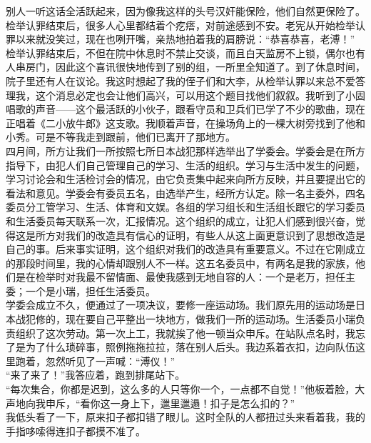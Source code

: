 别人一听这话全活跃起来，因为像我这样的头号汉奸能保险，他们自然更保险了。\\

检举认罪结束后，很多人心里都结着个疙瘩，对前途感到不安。老宪从开始检举认罪以来就没笑过，现在也咧开嘴，亲热地拍着我的肩膀说：“恭喜恭喜，老溥！”\\

检举认罪结束后，不但在院中休息时不禁止交谈，而且白天监房不上锁，偶尔也有人串房门，因此这个喜讯很快地传到了别的组，一所里全知道了。到了休息时间，院子里还有人在议论。我这时想起了我的侄子们和大李，从检举认罪以来总不爱答理我，这个消息必定也会让他们高兴，可以用这个题目找他们叙叙。我听到了小固唱歌的声音——这个最活跃的小伙子，跟看守员和卫兵们已学了不少的歌曲，现在正唱着《二小放牛郎》这支歌。我顺着声音，在操场角上的一棵大树旁找到了他和小秀。可是不等我走到跟前，他们已离开了那地方。\\

四月间，所方让我们一所按照七所日本战犯那样选举出了学委会。学委会是在所方指导下，由犯人们自己管理自己的学习、生活的组织。学习与生活中发生的问题，学习讨论会和生活检讨会的情况，由它负责集中起来向所方反映，并且要提出它的看法和意见。学委会有委员五名，由选举产生，经所方认定。除一名主委外，四名委员分工管学习、生活、体育和文娱。各组的学习组长和生活组长跟它的学习委员和生活委员每天联系一次，汇报情况。这个组织的成立，让犯人们感到很兴奋，觉得这是所方对我们的改造具有信心的证明，有些人从这上面更意识到了思想改造是自己的事。后来事实证明，这个组织对我们的改造具有重要意义。不过在它刚成立的那段时间里，我的心情却跟别人不一样。这五名委员中，有两名是我的家族，他们是在检举时对我最不留情面、最使我感到无地自容的人：一个是老万，担任主委；一个是小瑞，担任生活委员。\\

学委会成立不久，便通过了一项决议，要修一座运动场。我们原先用的运动场是日本战犯修的，现在要自己平整出一块地方，做我们一所的运动场。生活委员小瑞负责组织了这次劳动。第一次上工，我就挨了他一顿当众申斥。在站队点名时，我忘了是为了什么琐碎事，照例拖拖拉拉，落在别人后头。我边系着衣扣，边向队伍这里跑着，忽然听见了一声喊：“溥仪！”\\

“来了来了！”我答应着，跑到排尾站下。\\

“每次集合，你都是迟到，这么多的人只等你一个，一点都不自觉！”他板着脸，大声地向我申斥，“看你这一身上下，邋里邋遢！扣子是怎么扣的？”\\

我低头看了一下，原来扣子都扣错了眼儿。这时全队的人都扭过头来看着我，我的手指哆嗦得连扣子都摸不准了。\\


